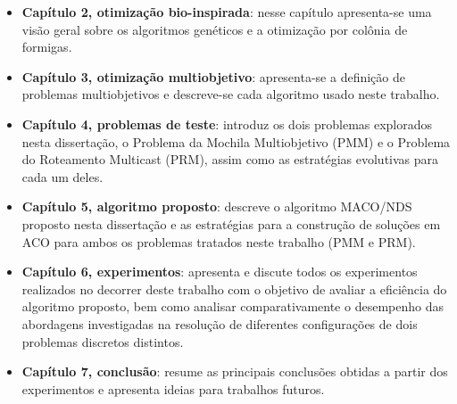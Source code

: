 \begin{itemize}  
	\item \textbf{Capítulo 2, otimização bio-inspirada}: nesse capítulo apresenta-se uma visão geral sobre os algoritmos genéticos e a otimização por colônia de formigas.
	\item \textbf{Capítulo 3, otimização multiobjetivo}: apresenta-se a definição de problemas multiobjetivos e descreve-se cada algoritmo usado neste trabalho.
	\item \textbf{Capítulo 4, problemas de teste}: introduz os dois problemas explorados nesta dissertação, o Problema da Mochila Multiobjetivo (PMM) e o Problema do Roteamento Multicast (PRM), assim como as estratégias evolutivas para cada um deles.
	\item \textbf{Capítulo 5, algoritmo proposto}: descreve o algoritmo \ac{MACO/NDS} proposto nesta dissertação e as estratégias para a construção de soluções em ACO para ambos os problemas tratados neste trabalho (PMM e PRM).
	\item \textbf{Capítulo 6, experimentos}: apresenta e discute todos os experimentos realizados no decorrer deste trabalho com o objetivo de avaliar a eficiência do algoritmo proposto, bem como analisar comparativamente o desempenho das abordagens investigadas na resolução de diferentes configurações de dois problemas discretos distintos.
	\item \textbf{Capítulo 7, conclusão}: resume as principais conclusões obtidas a partir dos experimentos e apresenta ideias para trabalhos futuros.
\end{itemize}